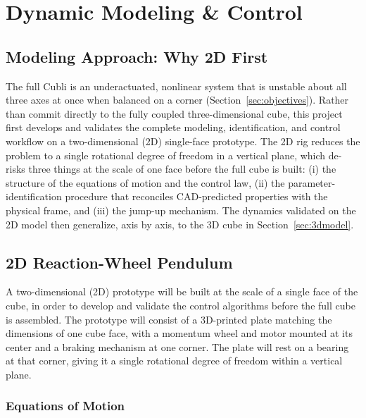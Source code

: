 \section{Dynamic Modeling \& Control}
\label{sec:modeling}

\subsection{Modeling Approach: Why 2D First}
\label{sec:2dfirst}

The full Cubli is an underactuated, nonlinear system that is unstable about all
three axes at once when balanced on a corner (Section~\ref{sec:objectives}).
Rather than commit directly to the fully coupled three-dimensional cube, this
project first develops and validates the complete modeling, identification, and
control workflow on a two-dimensional (2D) single-face prototype. The 2D rig
reduces the problem to a single rotational degree of freedom in a vertical plane,
which de-risks three things at the scale of one face before the full cube is
built: (i) the structure of the equations of motion and the control law, (ii) the
parameter-identification procedure that reconciles CAD-predicted properties with
the physical frame, and (iii) the jump-up mechanism. The dynamics validated on
the 2D model then generalize, axis by axis, to the 3D cube in
Section~\ref{sec:3dmodel}.

\subsection{2D Reaction-Wheel Pendulum}
\label{sec:2dmodel}

A two-dimensional (2D) prototype will be built at the scale of a single face of the cube, in order to develop and validate the control algorithms before the full cube is assembled. The prototype will consist of a 3D-printed plate matching the dimensions of one cube face, with a momentum wheel and motor mounted at its center and a braking mechanism at one corner. The plate will rest on a bearing at that corner, giving it a single rotational degree of freedom within a vertical plane.


\subsubsection{Equations of Motion}
\label{sec:2deom}

